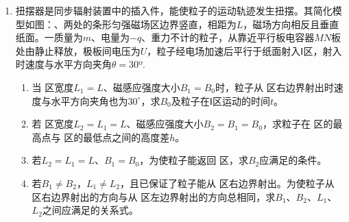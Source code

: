 \begin{enumerate}[leftmargin=0em]
{\begin{enumerate}
\end{enumerate}
}


\newpage
\item
{}
扭摆器是同步辐射装置中的插入件，能使粒子的运动轨迹发生扭摆。其简化模型如图：、两处的条形匀强磁场区边界竖直，相距为$ L $，磁场方向相反且垂直纸面。一质量为$ m $、电量为$ -q $、重力不计的粒子，从靠近平行板电容器$ MN $板处由静止释放，极板间电压为$ U $，粒子经电场加速后平行于纸面射入Ⅰ区，射入时速度与水平方向夹角$ \theta =30 $º.
\begin{enumerate}
\renewcommand{\labelenumi}{\arabic{enumi}.}
\item
当  区宽度$ L_1=L $、磁感应强度大小$ B_1=B_0 $时，粒子从  区右边界射出时速度与水平方向夹角也为$ 30 ^{\circ} $，求$ B_{0} $及粒子在Ⅰ区运动的时间$ t $。
\item 
若  区宽度$ L_2=L_1=L $、磁感应强度大小$ B_2=B_1=B_0 $，求粒子在  区的最高点与  区的最低点之间的高度差$ h $。
\item 
若$ L_2=L_1=L $、$ B_1=B_0 $，为使粒子能返回  区，求$ B_{2} $应满足的条件。
\item 
若$ B_1 \neq B_2 $，$ L_1 \neq L_2 $，且已保证了粒子能从  区右边界射出。为使粒子从  区右边界射出的方向与从  区左边界射出的方向总相同，求$ B_{1} $、$ B_{2} $、$ L_{1} $、$ L_{2} $之间应满足的关系式。



\end{enumerate}
\begin{figure}[h!]
\flushright

\end{figure}

\end{enumerate}
